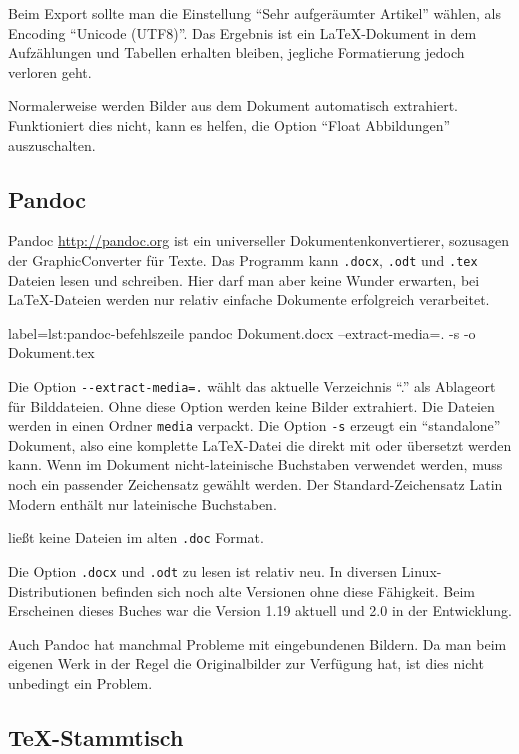 {Beim Export sollte man die Einstellung \enquote{Sehr aufgeräumter Artikel} wählen, als Encoding \enquote{Unicode (UTF8)}.
Das Ergebnis ist ein \LaTeX{}-Dokument in dem Aufzählungen und Tabellen erhalten bleiben, jegliche Formatierung jedoch verloren geht.

Normalerweise werden Bilder aus dem Dokument automatisch extrahiert.
Funktioniert dies nicht, kann es helfen, die Option \enquote{Float Abbildungen} auszuschalten.

\subsection{Pandoc}

Pandoc \url{http://pandoc.org} ist ein universeller Dokumentenkonvertierer, sozusagen der GraphicConverter für Texte.
Das Programm kann \texttt{.docx}, \texttt{.odt} und \texttt{.tex} Dateien lesen und schreiben.
Hier darf man aber keine Wunder erwarten, bei \LaTeX{}-Dateien werden nur relativ einfache Dokumente erfolgreich verarbeitet.

\begin{lfgwcode}{label={lst:pandoc-befehlszeile}}
pandoc Dokument.docx --extract-media=. -s -o Dokument.tex
\end{lfgwcode}

Die Option \texttt{-{}-extract-media=.} wählt das aktuelle Verzeichnis \enquote{.} als Ablageort für Bilddateien.
Ohne diese Option werden keine Bilder extrahiert.
Die Dateien werden in einen Ordner \texttt{media} verpackt.
Die Option \texttt{-s} erzeugt ein \enquote{standalone} Dokument, also eine komplette \LaTeX{}-Datei die direkt
mit  oder  übersetzt werden kann.
Wenn im Dokument nicht-lateinische Buchstaben verwendet werden, muss noch ein passender Zeichensatz gewählt werden.
Der Standard-Zeichensatz Latin Modern enthält nur lateinische Buchstaben.

 ließt keine Dateien im alten \texttt{.doc} Format.

Die Option \texttt{.docx} und \texttt{.odt} zu lesen ist relativ neu.
In diversen Linux-Distributionen befinden sich noch alte Versionen ohne diese Fähigkeit.
Beim Erscheinen dieses Buches war die Version 1.19 aktuell und 2.0 in der Entwicklung.

Auch Pandoc hat manchmal Probleme mit eingebundenen Bildern.
Da man beim eigenen Werk in der Regel die Originalbilder zur Verfügung hat, ist dies nicht unbedingt ein Problem.

\subsection{\TeX{}-Stammtisch}

}
